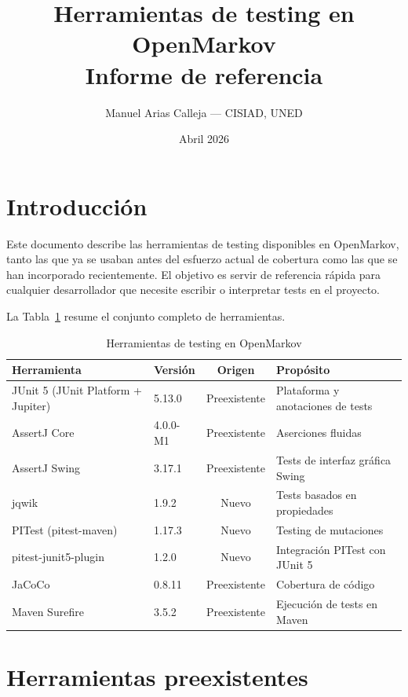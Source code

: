 \documentclass[12pt,a4paper]{article}
\title{\textbf{Herramientas de testing en OpenMarkov}\\[0.5em]
\large Informe de referencia}
\author{Manuel Arias Calleja --- CISIAD, UNED}
\date{Abril 2026}
\begin{document}
\maketitle
\tableofcontents
\newpage

\section{Introducción}
\label{sec:intro}

Este documento describe las herramientas de testing disponibles en OpenMarkov,
tanto las que ya se usaban antes del esfuerzo actual de cobertura como las que
se han incorporado recientemente. El objetivo es servir de referencia rápida
para cualquier desarrollador que necesite escribir o interpretar tests en el
proyecto.

La Tabla~\ref{tab:resumen} resume el conjunto completo de herramientas.

\begin{table}[H]
\centering
\begin{tabularx}{\textwidth}{llcX}
\toprule
\textbf{Herramienta} & \textbf{Versión} & \textbf{Origen} & \textbf{Propósito} \\
\midrule
JUnit 5 (JUnit Platform + Jupiter) & 5.13.0 & Preexistente & Plataforma y anotaciones de tests \\
AssertJ Core & 4.0.0-M1 & Preexistente & Aserciones fluidas \\
AssertJ Swing & 3.17.1 & Preexistente & Tests de interfaz gráfica Swing \\
jqwik & 1.9.2 & Nuevo & Tests basados en propiedades \\
PITest (pitest-maven) & 1.17.3 & Nuevo & Testing de mutaciones \\
pitest-junit5-plugin & 1.2.0 & Nuevo & Integración PITest con JUnit 5 \\
JaCoCo & 0.8.11 & Preexistente & Cobertura de código \\
Maven Surefire & 3.5.2 & Preexistente & Ejecución de tests en Maven \\
\bottomrule
\end{tabularx}
\caption{Herramientas de testing en OpenMarkov}
\label{tab:resumen}
\end{table}

\section{Herramientas preexistentes}
\label{sec:preexistentes}
\end{document}
